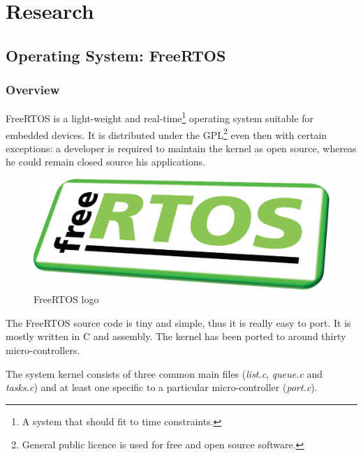 \chapter{Research}\label{chap:research}

\section{Operating System: FreeRTOS}

\subsection{Overview}

\hspace{15mm}FreeRTOS is a light-weight and real-time\footnote{A system that should fit to time constraints.} operating system suitable for embedded devices. It is distributed under the GPL\footnote{General public licence is used for free and open source software.} even then with certain exceptions: a developer is required to maintain the kernel as open source, whereas he could remain closed source his applications.

\begin{figure}[h]
  \centering
  \includegraphics[scale=0.125]{images/freertos.jpg}
  \caption{FreeRTOS logo}
\end{figure}

The FreeRTOS source code is tiny and simple, thus it is really easy to port. It is mostly written in C and assembly. The kernel has been ported to around thirty micro-controllers.

The system kernel consists of three common main files (\textit{list.c}, \textit{queue.c} and \textit{tasks.c}) and at least one specific to a particular micro-controller (\textit{port.c}).



